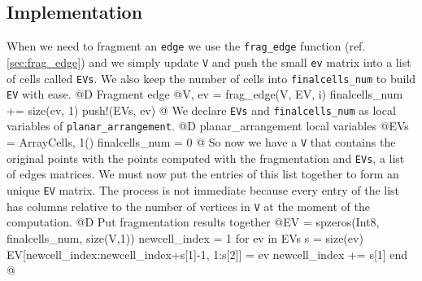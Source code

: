 \subsection{Implementation}
When we need to fragment an \texttt{edge} we use the \texttt{frag\_edge} function (ref. \ref{sec:frag_edge}) 
and we simply update \texttt{V} and push the small \texttt{ev} matrix into a list of cells called \texttt{EVs}.
We also keep the number of cells into \texttt{finalcells\_num} to build \texttt{EV} with ease.
@D Fragment edge
@{V, ev = frag_edge(V, EV, i)
finalcells_num += size(ev, 1)
push!(EVs, ev)
@}
We declare \texttt{EVs} and \texttt{finalcells\_num} as local variables of \texttt{planar\_arrangement}.
@D planar\_arrangement local variables
@{EVs = Array{Cells, 1}()
finalcells_num = 0
@}
So now we have a \texttt{V} that contains the original points with the points computed with the fragmentation
and \texttt{EVs}, a list of edges matrices. We must now put the entries of this list together to form an unique
\texttt{EV} matrix. The process is not immediate because every entry of the list has columns relative to the 
number of vertices in \texttt{V} at the moment of the computation.
@D Put fragmentation results together
@{EV = spzeros(Int8, finalcells_num, size(V,1))
newcell_index = 1
for ev in EVs
    s = size(ev)
    EV[newcell_index:newcell_index+s[1]-1, 1:s[2]] = ev
    newcell_index += s[1]
end
@}

